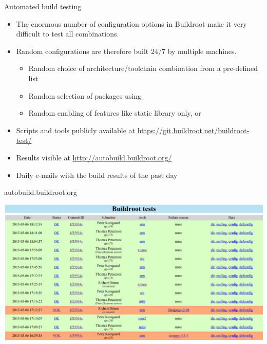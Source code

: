 \begin{frame}{Automated build testing}
  \begin{itemize}
  \item The enormous number of configuration options in Buildroot make
    it very difficult to test all combinations.
  \item Random configurations are therefore built 24/7 by multiple
    machines.
    \begin{itemize}
    \item Random choice of architecture/toolchain combination from a
      pre-defined list
    \item Random selection of packages using 
    \item Random enabling of features like static library only, or
    \end{itemize}
  \item Scripts and tools publicly available at
    \url{https://git.buildroot.net/buildroot-test/}
  \item Results visible at \url{http://autobuild.buildroot.org/}
  \item Daily e-mails with the build results of the past day
  \end{itemize}
\end{frame}

\begin{frame}{autobuild.buildroot.org}
  \begin{center}
    \includegraphics[height=0.8\textheight]{slides/buildroot-support-contribution/autobuild.png}
  \end{center}
\end{frame}


